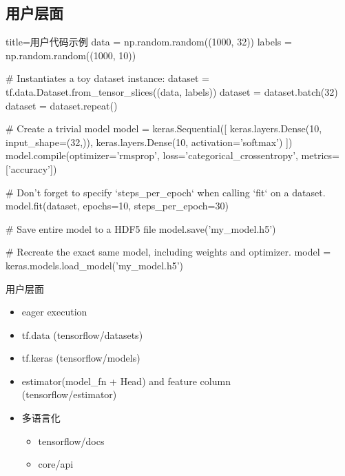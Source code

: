 
\subsection{用户层面}

\begin{frame}[fragile]
    \begin{tcblisting}{title=用户代码示例}
        data = np.random.random((1000, 32))
        labels = np.random.random((1000, 10))

        # Instantiates a toy dataset instance:
        dataset = tf.data.Dataset.from_tensor_slices((data, labels))
        dataset = dataset.batch(32)
        dataset = dataset.repeat()

        # Create a trivial model
        model = keras.Sequential([
            keras.layers.Dense(10, input_shape=(32,)),
            keras.layers.Dense(10, activation='softmax')
        ])
        model.compile(optimizer='rmsprop',
                      loss='categorical_crossentropy',
                      metrics=['accuracy'])

        # Don't forget to specify `steps_per_epoch` when calling `fit` on a dataset.
        model.fit(dataset, epochs=10, steps_per_epoch=30)

        # Save entire model to a HDF5 file
        model.save('my_model.h5')

        # Recreate the exact same model, including weights and optimizer.
        model = keras.models.load_model('my_model.h5')
    \end{tcblisting}
\end{frame}

\begin{frame}{用户层面}
    \begin{itemize}
        \item eager execution
        \item tf.data (tensorflow/datasets)
        \item tf.keras (tensorflow/models)
        \item estimator(model\_fn + Head) and feature column \\
              (tensorflow/estimator)
        \item 多语言化
            \begin{itemize}
                \item tensorflow/docs
                \item core/api
            \end{itemize}
    \end{itemize}
\end{frame}

